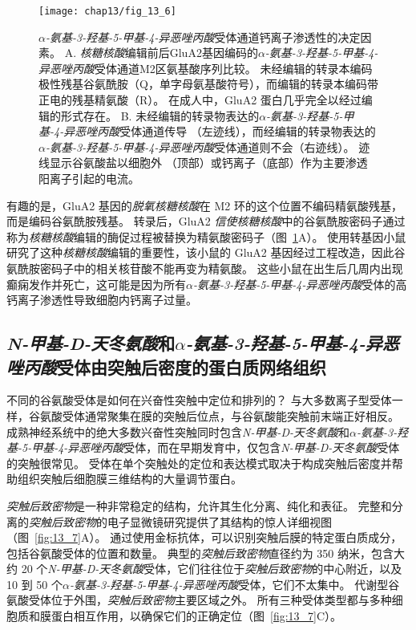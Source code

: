 \begin{figure}[htbp]
	\centering
	\texttt{[image: chap13/fig\_13\_6]}
	\caption{\textit{$\alpha$-氨基-3-羟基-5-甲基-4-异恶唑丙酸}受体通道钙离子渗透性的决定因素。
		A. \textit{核糖核酸}编辑前后GluA2基因编码的\textit{$\alpha$-氨基-3-羟基-5-甲基-4-异恶唑丙酸}受体通道M2区氨基酸序列比较。
		未经编辑的转录本编码极性残基谷氨酰胺（Q，单字母氨基酸符号），而编辑的转录本编码带正电的残基精氨酸（R）。
		在成人中，GluA2 蛋白几乎完全以经过编辑的形式存在。
		B. 未经编辑的转录物表达的\textit{$\alpha$-氨基-3-羟基-5-甲基-4-异恶唑丙酸}受体通道传导 （左迹线），而经编辑的转录物表达的\textit{$\alpha$-氨基-3-羟基-5-甲基-4-异恶唑丙酸}受体通道则不会（右迹线）。
		迹线显示谷氨酸盐以细胞外 （顶部）或钙离子（底部）作为主要渗透阳离子引起的电流\cite{sakmann1992nobel}。}
	\label{fig:13_6}
\end{figure}


有趣的是，GluA2 基因的\textit{脱氧核糖核酸}在 M2 环的这个位置不编码精氨酸残基，而是编码谷氨酰胺残基。
转录后，GluA2 \textit{信使核糖核酸}中的谷氨酰胺密码子通过称为\textit{核糖核酸}编辑的酶促过程被替换为精氨酸密码子（图~\ref{fig:13_6}A）。
使用转基因小鼠研究了这种\textit{核糖核酸}编辑的重要性，该小鼠的 GluA2 基因经过工程改造，因此谷氨酰胺密码子中的相关核苷酸不能再变为精氨酸。
这些小鼠在出生后几周内出现癫痫发作并死亡，这可能是因为所有\textit{$\alpha$-氨基-3-羟基-5-甲基-4-异恶唑丙酸}受体的高钙离子渗透性导致细胞内钙离子过量。



\subsection{\textit{N-甲基-D-天冬氨酸}和\textit{$\alpha$-氨基-3-羟基-5-甲基-4-异恶唑丙酸}受体由突触后密度的蛋白质网络组织}

不同的谷氨酸受体是如何在兴奋性突触中定位和排列的？ 
与大多数离子型受体一样，谷氨酸受体通常聚集在膜的突触后位点，与谷氨酸能突触前末端正好相反。
成熟神经系统中的绝大多数兴奋性突触同时包含\textit{N-甲基-D-天冬氨酸}和\textit{$\alpha$-氨基-3-羟基-5-甲基-4-异恶唑丙酸}受体，而在早期发育中，仅包含\textit{N-甲基-D-天冬氨酸}受体的突触很常见。
受体在单个突触处的定位和表达模式取决于构成突触后密度并帮助组织突触后细胞膜三维结构的大量调节蛋白。


\textit{突触后致密物}是一种非常稳定的结构，允许其生化分离、纯化和表征。
完整和分离的\textit{突触后致密物}的电子显微镜研究提供了其结构的惊人详细视图（图~\ref{fig:13_7}A）。 
通过使用金标抗体，可以识别突触后膜的特定蛋白质成分，包括谷氨酸受体的位置和数量。
典型的\textit{突触后致密物}直径约为 350 纳米，包含大约 20 个\textit{N-甲基-D-天冬氨酸}受体，它们往往位于\textit{突触后致密物}的中心附近，以及 10 到 50 个\textit{$\alpha$-氨基-3-羟基-5-甲基-4-异恶唑丙酸}受体，它们不太集中。
代谢型谷氨酸受体位于外围，\textit{突触后致密物}主要区域之外。
所有三种受体类型都与多种细胞质和膜蛋白相互作用，以确保它们的正确定位（图~\ref{fig:13_7}C）。


